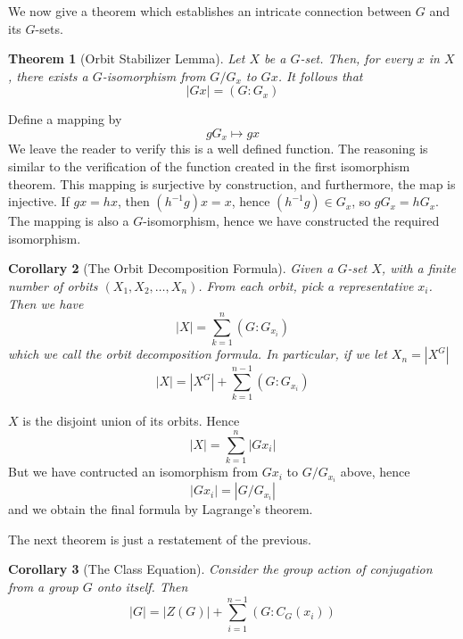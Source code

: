 \documentclass[12pt]{amsbook}
\makeatletter
\theoremstyle{plain}
\newtheorem{theorem}{Theorem}[chapter]
\newtheorem{corollary}[theorem]{Corollary}
\theoremstyle{definition}
\renewenvironment{proof}[1][\proofname]{\par
  \pushQED{\qed}%
  \normalfont \topsep6\p@\@plus6\p@\relax
  \list{}{\leftmargin=0em
          \rightmargin=\leftmargin
          \settowidth{\itemindent}{\itshape#1}%
          \labelwidth=\itemindent}

  \item[\hskip\labelsep
        \itshape
    #1\@addpunct{.}]\ignorespaces
}{%
  \popQED\endlist\@endpefalse
}
\makeatother
\begin{document}
We now give a theorem which establishes an intricate connection between $G$ and its $G$-sets.

\begin{theorem} [Orbit Stabilizer Lemma]
    Let $X$ be a $G$-set. Then, for every $x$ in $X$, there exists a $G$-isomorphism from $G/G_x$ to $Gx$. It follows that
    \[ |Gx| = (G:G_x) \]
\end{theorem}
\begin{proof}
    Define a mapping by
    \[ gG_x \mapsto gx \]
    We leave the reader to verify this is a well defined function. The reasoning is similar to the verification of the function created in the first isomorphism theorem. This mapping is surjective by construction, and furthermore, the map is injective. If $gx = hx$, then $(h^{-1}g)x = x$, hence $(h^{-1}g) \in G_x$, so $gG_x = hG_x$. The mapping is also a $G$-isomorphism, hence we have constructed the required isomorphism.
\end{proof}

\begin{corollary}[The Orbit Decomposition Formula] 
    Given a $G$-set $X$, with a finite number of orbits $(X_1, X_2, \dots, X_n)$. From each orbit, pick a representative $x_i$. Then we have
    \[ |X| = \sum_{k=1}^n (G:G_{x_i}) \]
    which we call the orbit decomposition formula. In particular, if we let $X_n = |X^G|$
    \[ |X| = |X^G| + \sum_{k=1}^{n-1} (G:G_{x_i}) \]
\end{corollary}
\begin{proof}
    $X$ is the disjoint union of its orbits. Hence
    \[ |X| = \sum_{k=1}^n |Gx_i| \]
    But we have contructed an isomorphism from $Gx_i$ to $G/G_{x_i}$ above, hence
    \[ |Gx_i| = |G/G_{x_i}| \]
    and we obtain the final formula by Lagrange's theorem.
\end{proof}

The next theorem is just a restatement of the previous.

\begin{corollary}[The Class Equation] 
    Consider the group action of conjugation from a group $G$ onto itself. Then
    \[ |G| = |Z(G)| + \sum_{i = 1}^{n-1} (G:C_G(x_i)) \]
\end{corollary}
\end{document}
